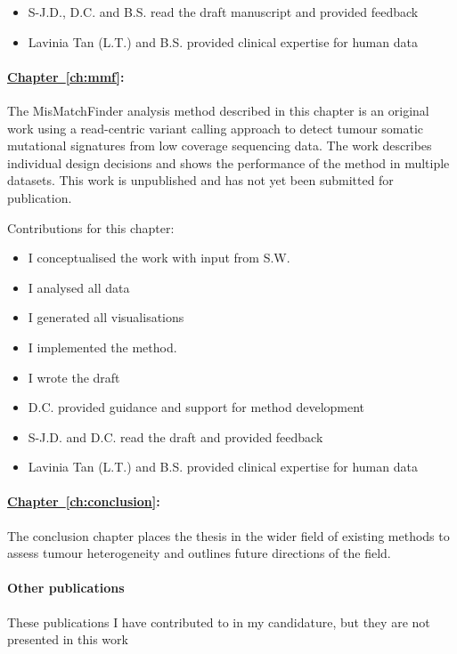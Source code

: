 {\begin{itemize}

	\item S-J.D., D.C. and  B.S. read the draft manuscript and provided feedback
	\item Lavinia Tan (L.T.) and B.S. provided clinical expertise for human data
	
\end{itemize}

\paragraph*{\hyperref[ch:mmf]{Chapter~\ref*{ch:mmf}}:}
The MisMatchFinder analysis method described in this chapter is an original work using a read-centric variant calling approach to detect tumour somatic mutational signatures from low coverage sequencing data. The work describes individual design decisions and shows the performance of the method in multiple datasets. This work is unpublished and has not yet been submitted for publication.

Contributions for this chapter:
\begin{itemize}
   	\item I conceptualised the work with input from S.W.
	\item I analysed all data
	\item I generated all visualisations
	\item I implemented the method.
	\item I wrote the draft
	\item D.C. provided guidance and support for method development
	\item S-J.D. and D.C. read the draft and provided feedback
	\item Lavinia Tan (L.T.) and B.S. provided clinical expertise for human data
	
\end{itemize}

\paragraph*{\hyperref[ch:conclusion]{Chapter~\ref*{ch:conclusion}}:}
The conclusion chapter places the thesis in the wider field of existing methods to assess tumour heterogeneity and outlines future directions of the field.

\cleardoublepage

\paragraph*{Other publications} These publications I have contributed to in my candidature, but they are not presented in this work

}
